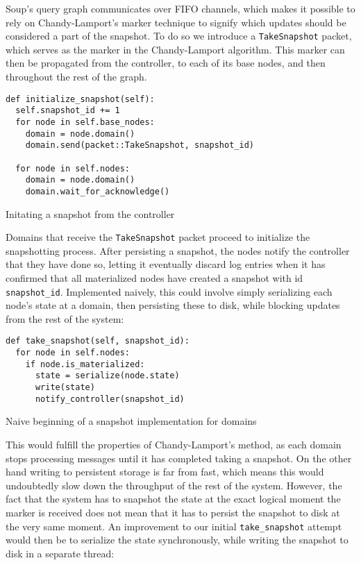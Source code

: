 \documentclass[b5paper]{report}
\begin{document}
Soup's query graph communicates over FIFO channels, which makes it possible to
rely on Chandy-Lamport's marker technique to signify which updates should be
considered a part of the snapshot. To do so we introduce a \texttt{TakeSnapshot}
packet, which serves as the marker in the Chandy-Lamport algorithm. This marker
can then be propagated from the controller, to each of its base nodes, and then
throughout the rest of the graph.

\begin{listing}[H]
  \begin{verbatim}
def initialize_snapshot(self):
  self.snapshot_id += 1
  for node in self.base_nodes:
    domain = node.domain()
    domain.send(packet::TakeSnapshot, snapshot_id)

  for node in self.nodes:
    domain = node.domain()
    domain.wait_for_acknowledge()
  \end{verbatim}

  \caption{Initating a snapshot from the controller}
\end{listing}

Domains that receive the \texttt{TakeSnapshot} packet proceed to initialize the
snapshotting process. After persisting a snapshot, the nodes notify the
controller that they have done so, letting it eventually discard log entries
when it has confirmed that all materialized nodes have created a snapshot with
id \texttt{snapshot\_id}. Implemented naively, this could involve simply
serializing each node's state at a domain, then persisting these to disk, while
blocking updates from the rest of the system:

\begin{listing}[H]
  \begin{verbatim}
def take_snapshot(self, snapshot_id):
  for node in self.nodes:
    if node.is_materialized:
      state = serialize(node.state)
      write(state)
      notify_controller(snapshot_id)
  \end{verbatim}
  \caption{Naive beginning of a snapshot implementation for domains}
\end{listing}

This would fulfill the properties of Chandy-Lamport's method, as each domain
stops processing messages until it has completed taking a snapshot. On the other
hand writing to persistent storage is far from fast, which means this would
undoubtedly slow down the throughput of the rest of the system. However, the
fact that the system has to snapshot the state at the exact logical moment the
marker is received does not mean that it has to persist the snapshot to disk at
the very same moment. An improvement to our initial \texttt{take\_snapshot}
attempt would then be to serialize the state synchronously, while writing the
snapshot to disk in a separate thread:
\end{document}
